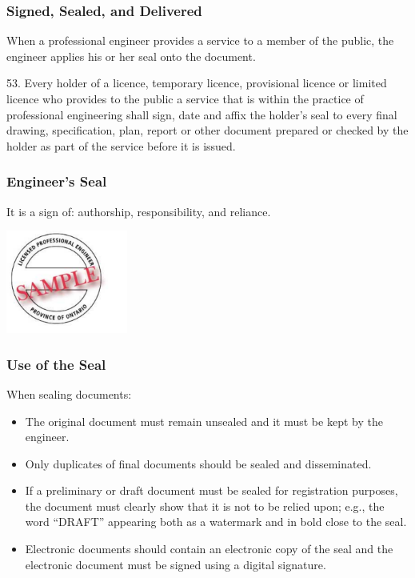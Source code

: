 \begin{frame}
\frametitle{Signed, Sealed, and Delivered}

When a professional engineer provides a service to a member of the public, the engineer applies his or her seal onto the document.


53.	Every holder of a licence, temporary licence, provisional licence or 	limited licence who provides to the public a service that is within 	the practice of professional engineering shall sign, date and affix the 	holder's seal to every final drawing, specification, plan, report or other 	document prepared or checked by the holder as part of the service 	before it is issued. 


\end{frame}



\begin{frame}
\frametitle{Engineer's Seal}

It is a sign of: authorship, responsibility, and reliance.

\begin{center}
	\includegraphics[width=0.3\textwidth]{images/engineer-seal}
\end{center}

\end{frame}



\begin{frame}
\frametitle{Use of the Seal}

When sealing documents:

\begin{itemize}
\item The original document must remain unsealed and it must be kept by the engineer.
\item Only duplicates of final documents should be sealed and disseminated.
\item If a preliminary or draft document must be sealed for registration purposes, the document must clearly show that it is not to be relied upon; e.g., the word ``DRAFT'' appearing both as a watermark and in bold close to the seal.
\item Electronic documents should contain an 
electronic copy of the seal and the electronic
document must be signed using a digital signature.
\end{itemize}

\end{frame}



